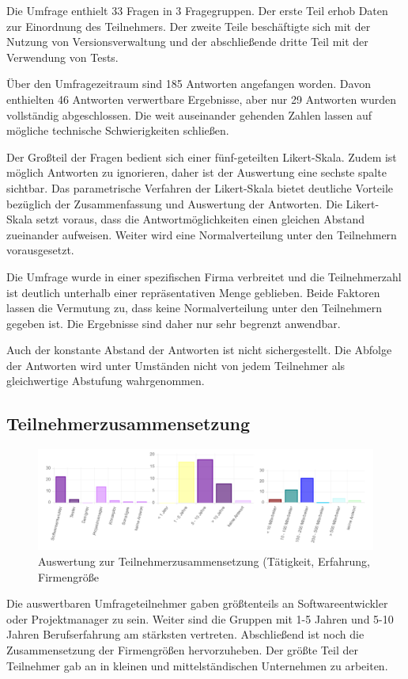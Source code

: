 Die Umfrage enthielt 33 Fragen in 3 Fragegruppen. Der erste Teil erhob Daten zur Einordnung des Teilnehmers. Der zweite Teile beschäftigte sich mit der Nutzung von Versionsverwaltung und der abschließende dritte Teil mit der Verwendung von Tests.

Über den Umfragezeitraum sind 185 Antworten angefangen worden. Davon enthielten 46 Antworten verwertbare Ergebnisse, aber nur 29 Antworten wurden vollständig abgeschlossen. Die weit auseinander gehenden Zahlen lassen auf mögliche technische Schwierigkeiten schließen.

Der Großteil der Fragen bedient sich einer fünf-geteilten Likert-Skala. Zudem ist möglich Antworten zu ignorieren, daher ist der Auswertung eine sechste spalte sichtbar. Das parametrische Verfahren  der Likert-Skala bietet deutliche Vorteile bezüglich der Zusammenfassung und Auswertung der Antworten. Die Likert-Skala setzt voraus, dass die Antwortmöglichkeiten einen gleichen Abstand zueinander aufweisen. Weiter wird eine Normalverteilung unter den Teilnehmern vorausgesetzt. 

Die Umfrage wurde in einer spezifischen Firma verbreitet und die Teilnehmerzahl ist deutlich unterhalb einer repräsentativen Menge geblieben. Beide Faktoren lassen die Vermutung zu, dass keine Normalverteilung unter den Teilnehmern gegeben ist. Die Ergebnisse sind daher nur sehr begrenzt anwendbar.

Auch der konstante Abstand der Antworten ist nicht sichergestellt. Die Abfolge der Antworten wird unter Umständen nicht von jedem Teilnehmer als gleichwertige Abstufung wahrgenommen.

\subsection{Teilnehmerzusammensetzung}

\begin{figure}[htbp]
  \includegraphics[width=\textwidth, height=\textheight, keepaspectratio]
    {resources/survey-participants.pdf}
  \caption{Auswertung zur Teilnehmerzusammensetzung (Tätigkeit, Erfahrung, Firmengröße}
\end{figure}
Die auswertbaren Umfrageteilnehmer gaben größtenteils an Softwareentwickler oder Projektmanager zu sein. Weiter sind die Gruppen mit 1-5 Jahren und 5-10 Jahren Berufserfahrung am stärksten vertreten. Abschließend ist noch die Zusammensetzung der Firmengrößen hervorzuheben. Der größte Teil der Teilnehmer gab an in kleinen und mittelständischen Unternehmen zu arbeiten.

